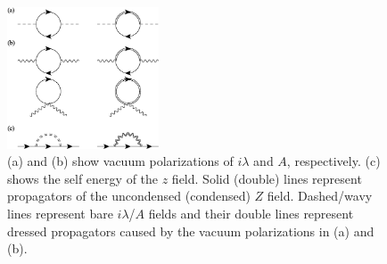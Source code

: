 \documentclass[aps,twocolumn,superscriptaddress]{revtex4-1}
\begin{document}
\begin{figure}
\includegraphics[width=0.4\textwidth]{self.eps}
\caption{\label{fig:self} (a) and (b) show vacuum polarizations of $i\lambda$ and $A$, respectively. (c) shows the self energy of the $z$ field. Solid (double) lines represent propagators of the uncondensed (condensed) $Z$ field. Dashed/wavy lines represent bare $i\lambda$/$A$ fields and their double lines represent dressed propagators caused by the vacuum polarizations in (a) and (b).}
\end{figure}
\end{document}
